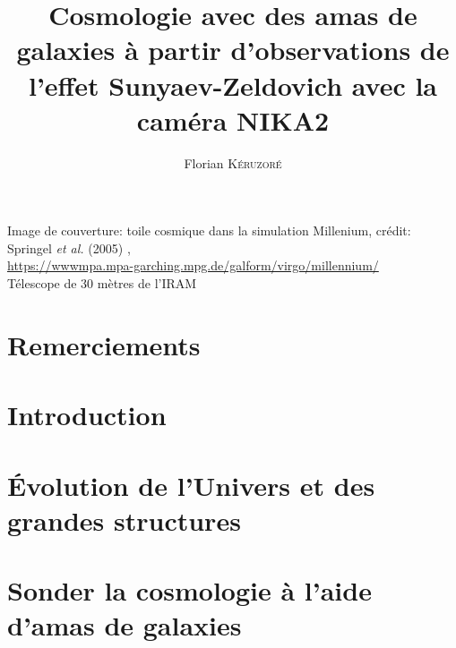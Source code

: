 \documentclass[a4paper, 12pt, twoside]{book}
\title{Cosmologie avec des amas de galaxies à partir d'observations de l'effet Sunyaev-Zeldovich avec la caméra NIKA2}
\author{Florian \textsc{K\'eruzor\'e}}
\date{}
\begin{document}
\begin{titlepage}
    
\end{titlepage}

\phantom{ }
\vfill
{\footnotesize \noindent
    Image de couverture: toile cosmique dans la simulation Millenium,
    crédit: Springel \textit{et al.} (2005) \cite{springel_simulations_2005}, \\
    \url{https://wwwmpa.mpa-garching.mpg.de/galform/virgo/millennium/} \\
    Télescope de 30 mètres de l'IRAM
}


\setlength{\parskip}{3pt}
\dominitoc[n]
\tableofcontents
\setlength{\parskip}{5pt}


\chapter*{Remerciements}

\adjustmtc

\chapter*{Introduction}
\label{chap:intro}


\chapter{Évolution de l'Univers et des grandes structures}
\label{chap:cosmo1}
\minitoc


\chapter{Sonder la cosmologie à l'aide d'amas de galaxies}
\label{chap:amas}
\minitoc

\end{document}
